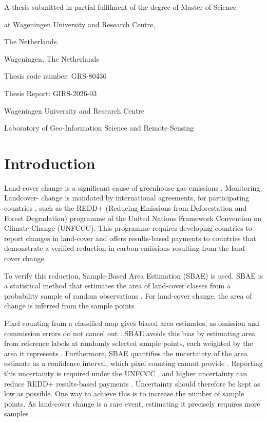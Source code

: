 \documentclass[11pt,a4paper]{report}
\newcommand{\thesiscode}{GRS-80436}
\newcommand{\thesisreport}{GIRS-2026-03}
\begin{document}
\begin{titlingpage}
\begin{center}
  {A thesis submitted in partial fulfilment of the degree of Master of Science}

  {at Wageningen University and Research Centre,}

  {The Netherlands.}\vspace{2.7cm}
  \end{center}

  \begin{flushright}
    {\thedate}

    {Wageningen, The Netherlands}
  \end{flushright}\vspace{0.5cm}

  Thesis code number: \thesiscode

  Thesis Report: \thesisreport

  {Wageningen University and Research Centre}

  {Laboratory of Geo-Information Science and Remote Sensing}
\end{titlingpage}
\restoregeometry

\chapter{Introduction}

Land-cover change is a significant cause of greenhouse gas emissions \parencite{masolele2021}. Monitoring
Landcover- change is mandated by international agreements, for participating countries \parencite{voigt2025}, such as the REDD+
(Reducing Emissions from Deforestation and Forest Degradation) programme of the United Nations Framework
Convention on Climate Change (UNFCCC). This programme requires developing countries to report changes in land-cover and offers
results-based payments to countries that demonstrate a verified reduction in carbon emissions resulting from the land-cover change.
 
To verify this reduction, Sample-Based Area Estimation (SBAE) is used. SBAE is
a statistical method that estimates the area of land-cover classes from a
probability sample of random observations \parencite{jonckheere2024}. For
land-cover change, the area of change is inferred from the sample points

Pixel counting from a classified map gives biased area estimates, as omission
and commission errors do not cancel out \parencite{olofsson2014}.
SBAE avoids this bias by estimating area from reference labels at randomly
selected sample points, each weighted by the area it represents \parencite{olofsson2014}.
Furthermore, SBAE quantifies the uncertainty of the area estimate as a confidence
interval, which pixel counting cannot provide \parencite{olofsson2014}. Reporting
this uncertainty is required under the UNFCCC \parencite{ipcc2019}, and higher
uncertainty can reduce REDD+ results-based payments \parencite{jonckheere2024}.
Uncertainty should therefore be kept as low as possible. One way to
achieve this is to increase the number of sample points. As land-cover change is a 
rare event, estimating it precisely requires more samples \parencite{pagliarella2018}.
\end{document}
